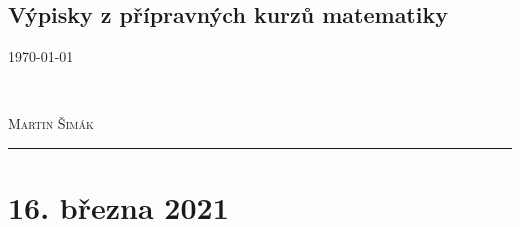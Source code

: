 \documentclass[11pt,a4paper]{article}
\begin{document}


    \begin{center}
        \section*{Výpisky z přípravných kurzů matematiky}
        \vspace*{-4mm}
        \begin{minipage}{0.4\textwidth}
            \begin{flushleft}
                \textsc{\today}
            \end{flushleft}
        \end{minipage}
        ~
        \begin{minipage}{0.4\textwidth}
            \begin{flushright}
                \textsc{Martin Šimák}
            \end{flushright}
        \end{minipage}
        \noindent\rule{14.5cm}{0.6pt}
    \end{center}

    \section*{16. března 2021}
\end{document}
